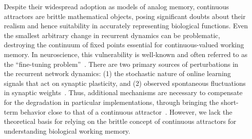 \documentclass{article} %
\newcounter{ct}
\theoremstyle{definition}
\theoremstyle{remark}
\renewcommand{\cite}{\citep}
\begin{document}


Despite their widespread adoption as models of analog memory, continuous attractors are brittle mathematical objects, posing significant doubts about their realism and hence suitability in accurately representing biological functions.
Even the smallest arbitrary change in recurrent dynamics can be problematic, destroying the continuum of fixed points essential for continuous-valued working memory.
In neuroscience, this vulnerability is well-known and often referred to as the ``fine-tuning problem''~\cite{seung1996,Renart2003,Park2023a}.
There are two primary sources of perturbations in the recurrent network dynamics:
(1) the stochastic nature of online learning signals that act on synaptic plasticity, and
(2) observed spontaneous fluctuations in synaptic weights~\cite{Fusi2007-yg,shimizu2021}.
Thus, additional mechanisms are necessary to compensate for the degradation in particular implementations, through bringing the short-term behavior close to that of a continuous attractor~\cite{Lim2012,Lim2013,Boerlin2013,Koulakov2002,Renart2003,gu2022}.
However, we lack the theoretical basis for relying on the brittle concept of continuous attractors for understanding biological working memory.
\end{document}
